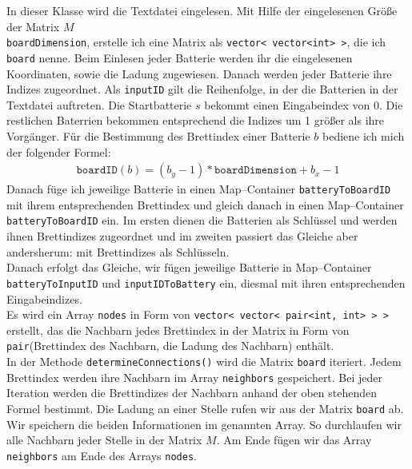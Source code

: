 \documentclass[a4paper,10pt,ngerman]{scrartcl}
\begin{document}
In dieser Klasse wird die Textdatei eingelesen. Mit Hilfe der eingelesenen Größe der Matrix $M$\\ \texttt{boardDimension},
erstelle ich eine Matrix als \texttt{vector< vector<int> >}, die ich \texttt{board} nenne.
Beim Einlesen jeder Batterie werden ihr die eingelesenen Koordinaten, sowie die Ladung zugewiesen.
Danach werden jeder Batterie ihre Indizes zugeordnet. Als \texttt{inputID} gilt die
Reihenfolge, in der die Batterien in der Textdatei auftreten. Die Startbatterie $s$ bekommt einen
Eingabeindex von 0. Die restlichen Baterrien bekommen entsprechend die Indizes um 1 größer als ihre Vorgänger.
Für die Bestimmung des Brettindex einer Batterie $b$ bediene ich mich der folgender Formel:
\begin{align*}
\texttt{boardID}(b) = (b_y-1) * \texttt{boardDimension} + b_x-1
\end{align*}
Danach füge ich jeweilige Batterie in einen Map--Container \texttt{batteryToBoardID} mit ihrem entsprechenden Brettindex
und gleich danach in einen Map--Container \texttt{batteryToBoardID} ein. Im ersten dienen die Batterien als Schlüssel und werden
ihnen Brettindizes zugeordnet und im zweiten passiert das Gleiche aber andersherum: mit Brettindizes als Schlüsseln.\\
Danach erfolgt das Gleiche, wir fügen jeweilige Batterie in Map--Container \texttt{batteryToInputID} und
\texttt{inputIDToBattery} ein, diesmal mit ihren entsprechenden Eingabeindizes.\\

Es wird ein Array \texttt{nodes} in Form von \texttt{vector< vector< pair<int, int> > >}
erstellt, das die Nachbarn jedes Brettindex in der Matrix in Form von 
\texttt{pair}(Brettindex des Nachbarn, die Ladung des Nachbarn) enthält.\\
In der Methode \texttt{determineConnections()} wird die Matrix \texttt{board} iteriert.
Jedem Brettindex werden ihre Nachbarn im Array \texttt{neighbors} gespeichert.
Bei jeder Iteration werden die Brettindizes der Nachbarn anhand der oben stehenden Formel bestimmt.
Die Ladung an einer Stelle rufen wir aus der Matrix \texttt{board} ab. Wir speichern die beiden Informationen
im genannten Array. So durchlaufen wir alle Nachbarn jeder Stelle in der Matrix $M$.
Am Ende fügen wir das Array \texttt{neighbors} am Ende des Arrays \texttt{nodes}.\\
\end{document}
